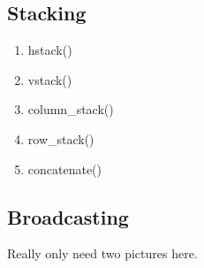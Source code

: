 \subsection*{Stacking}

\begin{enumerate}
\item hstack()
\item vstack()
\item column\_stack()
\item row\_stack()
\item concatenate()
\end{enumerate}

\subsection*{Broadcasting}

Really only need two pictures here.




